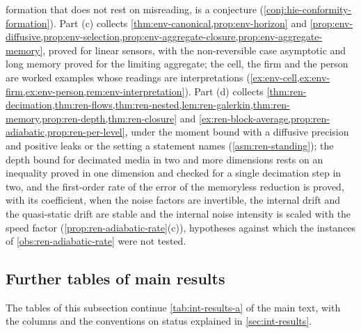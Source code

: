 formation that does not rest on misreading, is a conjecture (\cref{conj:hie-conformity-formation}). Part (c) collects \cref{thm:env-canonical,prop:env-horizon} and \cref{prop:env-diffusive,prop:env-selection,prop:env-aggregate-closure,prop:env-aggregate-memory}, proved for linear sensors, with the non-reversible case asymptotic and long memory proved for the limiting aggregate; the cell, the firm and the person are worked examples whose readings are interpretations (\cref{ex:env-cell,ex:env-firm,ex:env-person,rem:env-interpretation}). Part (d) collects \cref{thm:ren-decimation,thm:ren-flows,thm:ren-nested,lem:ren-galerkin,thm:ren-memory,prop:ren-depth,thm:ren-closure} and \cref{ex:ren-block-average,prop:ren-adiabatic,prop:ren-per-level}, under the moment bound with a diffusive precision and positive leaks or the setting a statement names (\cref{asm:ren-standing}); the depth bound for decimated media in two and more dimensions rests on an inequality proved in one dimension and checked for a single decimation step in two, and the first-order rate of the error of the memoryless reduction is proved, with its coefficient, when the noise factors are invertible, the internal drift and the quasi-static drift are stable and the internal noise intensity is scaled with the speed factor (\cref{prop:ren-adiabatic-rate}(c)), hypotheses against which the instances of \cref{obs:ren-adiabatic-rate} were not tested.

\subsection{Further tables of main results}\label{sup:int-further-tables-of-main-results}

The tables of this subsection continue \cref{tab:int-results-a} of the main text, with the columns and the conventions on status explained in \cref{sec:int-results}.

